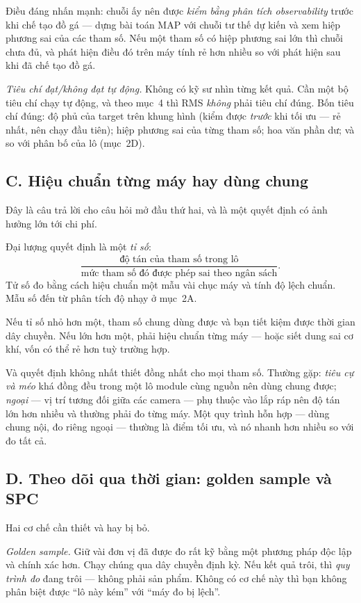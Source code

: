\documentclass[../../vslam.tex]{subfiles}
\begin{document}
Điều đáng nhấn mạnh: chuỗi ấy nên được \emph{kiểm bằng phân tích observability} trước khi chế tạo đồ gá --- dựng bài toán MAP với chuỗi tư thế dự kiến và xem hiệp phương sai của các tham số. Nếu một tham số có hiệp phương sai lớn thì chuỗi chưa đủ, và phát hiện điều đó trên máy tính rẻ hơn nhiều so với phát hiện sau khi đã chế tạo đồ gá.

\emph{Tiêu chí đạt/không đạt tự động.} Không có kỹ sư nhìn từng kết quả. Cần một bộ tiêu chí chạy tự động, và theo  mục~4 thì RMS \emph{không} phải tiêu chí đúng. Bốn tiêu chí đúng: độ phủ của target trên khung hình (kiểm được \emph{trước} khi tối ưu --- rẻ nhất, nên chạy đầu tiên); hiệp phương sai của từng tham số; hoa văn phần dư; và so với phân bố của lô (mục~2D).

\subsection{C. Hiệu chuẩn từng máy hay dùng chung}

Đây là câu trả lời cho câu hỏi mở đầu thứ hai, và là một quyết định có ảnh hưởng lớn tới chi phí.

Đại lượng quyết định là một \emph{tỉ số}:
\[
\frac{\text{độ tán của tham số trong lô}}{\text{mức tham số đó được phép sai theo ngân sách}}.
\]
Tử số đo bằng cách hiệu chuẩn một mẫu vài chục máy và tính độ lệch chuẩn. Mẫu số đến từ phân tích độ nhạy ở mục~2A.

Nếu tỉ số nhỏ hơn một, tham số chung dùng được và bạn tiết kiệm được thời gian dây chuyền. Nếu lớn hơn một, phải hiệu chuẩn từng máy --- hoặc siết dung sai cơ khí, vốn có thể rẻ hơn tuỳ trường hợp.

Và quyết định không nhất thiết đồng nhất cho mọi tham số. Thường gặp: \emph{tiêu cự và méo} khá đồng đều trong một lô module cùng nguồn nên dùng chung được; \emph{ngoại} --- vị trí tương đối giữa các camera --- phụ thuộc vào lắp ráp nên độ tán lớn hơn nhiều và thường phải đo từng máy. Một quy trình hỗn hợp --- dùng chung nội, đo riêng ngoại --- thường là điểm tối ưu, và nó nhanh hơn nhiều so với đo tất cả.

\subsection{D. Theo dõi qua thời gian: golden sample và SPC}

Hai cơ chế cần thiết và hay bị bỏ.

\emph{Golden sample.} Giữ vài đơn vị đã được đo rất kỹ bằng một phương pháp độc lập và chính xác hơn. Chạy chúng qua dây chuyền định kỳ. Nếu kết quả trôi, thì \emph{quy trình đo} đang trôi --- không phải sản phẩm. Không có cơ chế này thì bạn không phân biệt được ``lô này kém'' với ``máy đo bị lệch''.
\end{document}

